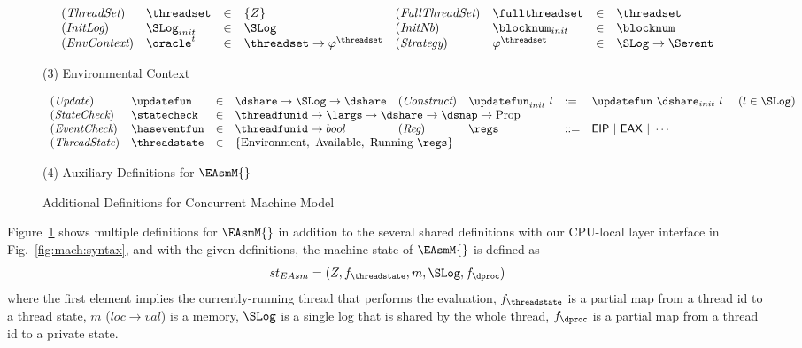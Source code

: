 \begin{figure}
\begin{small}
\[
\begin{array}{llll llll}
(\textit{ThreadSet}) & \threadset & \in & \{Z\} &
(\textit{FullThreadSet}) & \fullthreadset & \in & \threadset \\
(\textit{InitLog}) & \SLog_{init} & \in & \SLog &
(\textit{InitNb}) & \blocknum_{init} & \in & \blocknum \\
(\textit{EnvContext}) & \oracle^{t} & \in & \threadset \rightarrow \varphi^{\threadset} &
(\textit{Strategy}) & \varphi^{\threadset} & \in & \SLog \rightarrow \Sevent \\
\end{array}
\]
\begin{center}
(3) Environmental Context
\end{center}
\vspace{-1em}

\[
\begin{array}{llllllll}
(\textit{Update}) & \updatefun & \in & \dshare \rightarrow \SLog \rightarrow \dshare &
(\textit{Construct}) & \updatefun_{init} \ l& := & \updatefun\ \dshare_{init} \ l  \ \ \ \ (l \in \SLog) \\
(\textit{StateCheck}) & \statecheck & \in &
\multicolumn{5}{l}{
 \threadfunid \rightarrow \largs \rightarrow \dshare \rightarrow \dsnap \rightarrow \mathrm{Prop}
 }
 \\
 (\textit{EventCheck}) & \haseventfun & \in & \threadfunid \rightarrow bool  &
(\textit{Reg})  &\regs & ::= & \mathsf{EIP} \ | \ \mathsf{EAX} \ | \  \cdots \\
(\textit{ThreadState}) & \threadstate & \in &
\multicolumn{5}{l}{
 \{\mathrm{Environment}, \ \mathrm{Available}, \ \mathrm{Running}\ \regs \} 
  }
\end{array}
\]
\begin{center}
(4) Auxiliary Definitions for $\EAsmM{}$
\end{center}
\vspace{-1em}

\end{small}
\caption{Additional Definitions for Concurrent Machine Model}
\label{fig:mach:thread-syntax}
\vspace{-17pt}
\end{figure}
Figure~\ref{fig:mach:thread-syntax} shows multiple definitions for $\EAsmM{}$ in addition to the several 
shared definitions with our CPU-local layer interface in Fig.~\ref{fig:mach:syntax}, and
with the given definitions, the machine state of $\EAsmM{}$ is defined as
\[
st_{EAsm} = (Z, f_{\threadstate}, m, \SLog, f_{\dproc})
\] 
where the first element implies the currently-running thread that performs the evaluation, 
$f_{\threadstate}$ is a partial map from a thread id to a thread state, 
$m$ ($loc \rightarrow val$) is a memory, $\SLog$ is a single log that is shared by the whole thread, 
$f_{\dproc}$ is a partial map from a thread id to a private state.

